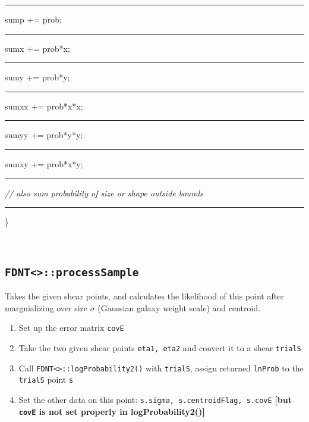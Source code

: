 \documentclass[useAMS,usenatbib,usegraphicx]{mn2e}
\begin{document}
\begin{enumerate}
\begin{boxit}
{ \rule{0.2in}{0in}     sump += prob;\\
 \rule{0.2in}{0in}     sumx += prob*x;\\
 \rule{0.2in}{0in}     sumy += prob*y;\\
 \rule{0.2in}{0in}     sumxx += prob*x*x;\\
 \rule{0.2in}{0in}     sumyy += prob*y*y;\\
 \rule{0.2in}{0in}     sumxy += prob*x*y;\\
 \rule{0.2in}{0in}     {\it // also sum probability of size or shape outside bounds}\\
 \rule{0.1in}{0in} \} } \\
\end{boxit}
\end{enumerate}
      
\subsection{\texttt{FDNT<>::processSample}}
Takes the given shear points, and calculates the likelihood of this point after margnializing
over size $\sigma$ (Gaussian galaxy weight scale) and centroid.
\begin{enumerate}
\item Set up the error matrix {\tt covE}
\item Take the two given shear points {\tt eta1, eta2} and convert it to a shear {\tt trialS}
\item Call {\tt FDNT<>::logProbability2()} with {\tt trialS}, assign returned {\tt lnProb} to
the {\tt trialS} point {\tt s}
\item Set the other data on this point: {\tt s.sigma, s.centroidFlag, s.covE}
{\bf [but {\tt covE} is not set properly in logProbability2()]}
\end{enumerate}
\end{document}
